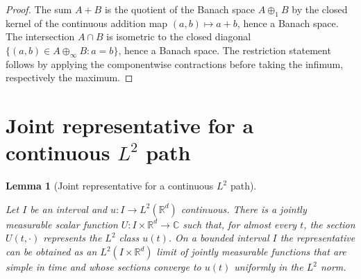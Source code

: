 \documentclass[11pt,oneside]{book}
\providecommand{\uses}[1]{}
\newtheorem{lemma}[theorem]{Lemma}
\theoremstyle{definition}
\theoremstyle{remark}
\newcommand{\R}{\mathbb R}
\newcommand{\C}{\mathbb C}
\newcommand{\1}{\mathbf 1}
\begin{document}
\begin{proof}
\uses{def:sum-intersection-norm}
The sum $A+B$ is the quotient of the Banach space $A\oplus_1 B$ by the closed kernel of the continuous addition map $(a,b)\mapsto a+b$, hence a Banach space. The intersection $A\cap B$ is isometric to the closed diagonal $\{(a,b)\in A\oplus_\infty B:a=b\}$, hence a Banach space. The restriction statement follows by applying the componentwise contractions before taking the infimum, respectively the maximum.
\end{proof}

\section{Joint representative for a continuous \texorpdfstring{$L^2$}{L2} path}

\begin{lemma}[Joint representative for a continuous $L^2$ path]\label{lem:joint-representative-L2}
\uses{conv:joint-representatives, def:scalar-mixed-norm}
Let $I$ be an interval and $u:I\to L^2(\R^d)$ continuous. There is a jointly measurable scalar function $U:I\times\R^d\to\C$ such that, for almost every $t$, the section $U(t,\cdot)$ represents the $L^2$ class $u(t)$. On a bounded interval $I$ the representative can be obtained as an $L^2(I\times\R^d)$ limit of jointly measurable functions that are simple in time and whose sections converge to $u(t)$ uniformly in the $L^2$ norm.
\end{lemma}
\end{document}
